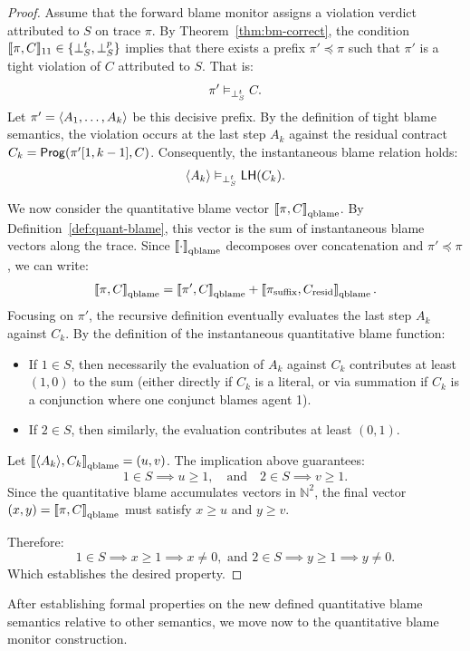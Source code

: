                 \begin{proof}
                  Assume that the forward blame monitor assigns a violation verdict attributed to $S$ on trace $\pi$.
                  By Theorem~\ref{thm:bm-correct}, the condition $\llbracket \pi,C \rrbracket_{11} \in \{ \bot^t_{S}, \bot^p_{S} \}$ implies that there exists a prefix $\pi' \preceq \pi$ such that $\pi'$ is a tight violation of $C$ attributed to $S$.
                  That is:
                  \[
                  \pi' \vDash_{\bot^t_{S}} C.
                  \]
                  Let $\pi' = \langle A_1, \dots, A_k \rangle $ be this decisive prefix.
                  By the definition of tight blame semantics, the violation occurs at the last step $A_k$ against the residual contract $C_k = \mathsf{Prog}(\pi'[1,k-1], C)$.
                  Consequently, the instantaneous blame relation holds:
                  \[
                  \langle A_k \rangle  \vDash_{\bot^t_{S}} \mathsf{LH}(C_k).
                  \]
                  
                  We now consider the quantitative blame vector $\left\llbracket \pi,C \right\rrbracket_{\text{qblame}}$.
                  By Definition~\ref{def:quant-blame}, this vector is the sum of instantaneous blame vectors along the trace.
                  Since $\left\llbracket \cdot \right\rrbracket_{\text{qblame}}$ decomposes over concatenation and $\pi' \preceq \pi$, we can write:
                  \[
                  \left\llbracket \pi,C \right\rrbracket_{\text{qblame}} = \left\llbracket \pi',C \right\rrbracket_{\text{qblame}} + \left\llbracket \pi_{\text{suffix}}, C_{\text{resid}} \right\rrbracket_{\text{qblame}}.
                  \]
                  Focusing on $\pi'$, the recursive definition eventually evaluates the last step $A_k$ against $C_k$.
                  By the definition of the instantaneous quantitative blame function:
                  \begin{itemize}
                      \item If $1 \in S$, then necessarily the evaluation of $A_k$ against $C_k$ contributes at least $(1,0)$ to the sum (either directly if $C_k$ is a literal, or via summation if $C_k$ is a conjunction where one conjunct blames agent 1).
                      \item If $2 \in S$, then similarly, the evaluation contributes at least $(0,1)$.
                  \end{itemize}
                  Let $\left\llbracket \langle A_k \rangle , C_k \right\rrbracket_{\text{qblame}} = (u,v)$. The implication above guarantees:
                  \[
                  1 \in S \implies u \ge 1, \quad \text{and} \quad 2 \in S \implies v \ge 1.
                  \]
                  Since the quantitative blame accumulates vectors in $\mathbb{N}^2$, the final vector $(x,y) = \left\llbracket \pi,C \right\rrbracket_{\text{qblame}}$ must satisfy $x \ge u$ and $y \ge v$.
                  
                  Therefore:
                  \[
                  1 \in S \implies x \ge 1 \implies x \neq 0,
                  \text{ and }
                  2 \in S \implies y \ge 1 \implies y \neq 0.
                  \]
                  Which establishes the desired property.
              \end{proof}
After establishing formal properties on the new defined quantitative blame semantics relative to other semantics, we move now to the quantitative blame monitor construction.

